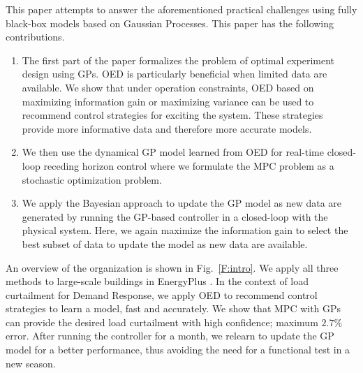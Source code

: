 This paper attempts to answer the aforementioned practical challenges using fully black-box models based on Gaussian Processes.
This paper has the following contributions.
\begin{enumerate}
	\item The first part of the paper formalizes the problem of optimal experiment design using GPs. OED is particularly beneficial when limited data are available. We show that under operation constraints, OED based on maximizing information gain or maximizing variance can be used to recommend control strategies for exciting the system. These strategies provide more informative data and therefore more accurate models.
	\item We  then use the dynamical GP model learned from OED for real-time closed-loop receding horizon control where we formulate the MPC problem as a stochastic optimization problem.
	\item We apply the Bayesian approach to update the GP model as new data are generated by running the GP-based controller in a closed-loop with the physical system. Here, we again maximize the information gain to select the best subset of data to update the model as new data are available.
\end{enumerate}
An overview of the organization is shown in Fig.~\ref{F:intro}.
We apply all three methods to large-scale buildings in EnergyPlus \cite{Deru2011}. In the context of load curtailment for Demand Response, we apply OED to recommend control strategies to learn a model, fast and accurately. We show that MPC with GPs can provide the desired load curtailment with high confidence; maximum \(2.7\%\) error. After running the controller for a month, we relearn to update the GP model for a better performance, thus avoiding the need for a functional test in a new season.

